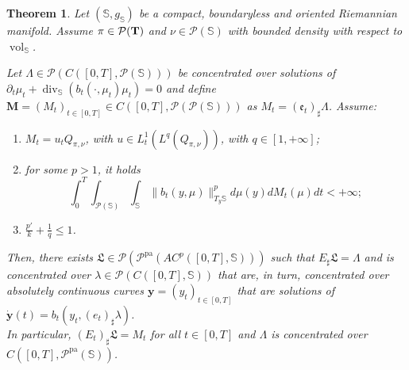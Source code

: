 \documentclass[10pt,leqno]{amsart}
\numberwithin{equation}{section}
\newtheorem{teorema}{Theorem}[section]
\newcommand{\Q}{\mathbb{Q}}
\newcommand{\PP}{\mathcal{P}}
\newcommand{\PPpa}{\PP^{\operatorname{pa}}}
\renewcommand{\Q}{Q}
\newcommand{\Ss}{\mathbb{S}}
\begin{document}
\begin{teorema}\label{main theorem manifold}
    Let $(\mathbb{S},g_{\mathbb{S}})$ be a compact, boundaryless and oriented Riemannian manifold. Assume $\pi \in \PP(\bold{T})$ and $\nu\in \PP(\Ss)$ with bounded density with respect to $\operatorname{vol}_\Ss$.
    
    Let $\Lambda \in \PP(C([0,T],\PP(\mathbb{S})))$ be concentrated over solutions of $\partial_t\mu_t + \operatorname{div}_\Ss(b_t(\cdot,\mu_t)\mu_t) = 0$ and define $\boldsymbol{M} = (M_t)_{t\in[0,T]} \in C([0,T],\PP(\PP(\mathbb{S})))$ as $M_t = (\mathfrak{e}_t)_\sharp \Lambda$. Assume:
    \begin{enumerate}
        \item $M_t = u_t \Q_{\pi,\nu}$, with $u \in L^1_t(L^q(\Q_{\pi,\nu}))$, with $q\in[1,+\infty]$;
        \item for some $p>1$, it holds
        \begin{equation}
            \int_0^T\int_{\PP(\Ss)} \int_\Ss \|b_t(y,\mu)\|_{T_y\Ss}^p d\mu(y)dM_t(\mu)dt <+\infty;
        \end{equation}
        \item $\frac{p'}{k}+\frac{1}{q}\leq1$. 
    \end{enumerate}
    Then, there exists $\mathfrak{L}\in \PP(\PPpa(AC^p([0,T],\Ss)))$ such that $E_\sharp \mathfrak{L} = \Lambda$ and is concentrated over $\lambda\in \PP(C([0,T],\Ss))$ that are, in turn, concentrated over absolutely continuous curves $\boldsymbol{y} = (y_t)_{t\in [0,T]}$ that are solutions of $\dot{\boldsymbol{y}}(t) = b_t(y_t,(e_t)_\sharp\lambda)$.
    \\
    In particular, $(E_t)_\sharp \mathfrak{L} = M_t$ for all $t\in[0,T]$ and $\Lambda$ is concentrated over $C([0,T],\PP^{\operatorname{pa}}(\mathbb{S}))$.
\end{teorema}
\end{document}
